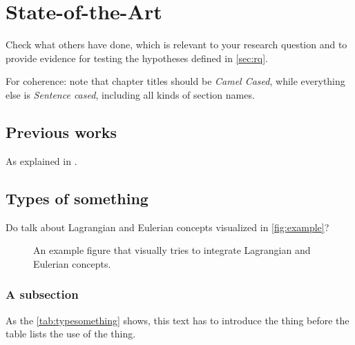 \chapter{State-of-the-Art}
\label{ch:soa}


Check what others have done, which is relevant to your research question and to provide evidence for testing the hypotheses defined in \autoref{sec:rq}.

For coherence: note that chapter titles should be \textit{Camel Cased}, while everything else is \textit{Sentence cased}, including all kinds of section names.

\section{Previous works}
\label{sec:prevworks}
	
As explained in .
	
	
\section{Types of something}
\label{sec:typesome}

Do  talk about Lagrangian and Eulerian concepts visualized in \autoref{fig:example}?

\begin{figure}[htp]
	\begin{center}
		\begin{minipage}{\textwidth}
			\centering
			\caption[An example figure.]{An example figure that visually tries to integrate Lagrangian and Eulerian concepts.}
			\label{fig:example}
		\end{minipage}
	\end{center}
\end{figure}

		
\subsection{A subsection}
\label{subsec:somesome}
		
As the \autoref{tab:typesomething} shows, this text has to introduce the thing before the table lists the use of the thing.
		
